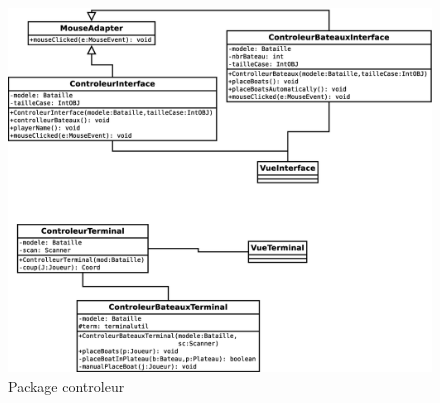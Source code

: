 \documentclass{article}
\begin{document}
\begin{figure}[htp]
\centering
\includegraphics[scale=0.30]{images/Diagramme/package_controleur.eps}
\caption{\label{fig:Controleur}Package controleur}
\end{figure}
\end{document}
